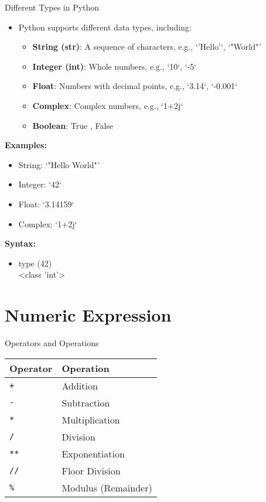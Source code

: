\documentclass[serif, aspectratio=169]{beamer}
\begin{document}
\begin{frame}{Different Types in Python}
    \begin{itemize}[<+-| alert@+>] %
        \item Python supports different data types, including:
        \begin{itemize}
            \item \textbf{String (str)}: A sequence of characters, e.g., `'Hello'`, `"World"`
            \item \textbf{Integer (int)}: Whole numbers, e.g., `10`, `-5`
            \item \textbf{Float}: Numbers with decimal points, e.g., `3.14`, `-0.001`
            \item \textbf{Complex}: Complex numbers, e.g., `1+2j`
            \item \textbf{Boolean}: True , False
        \end{itemize}
    \end{itemize}
    \vspace{0.5cm}
    \textbf{Examples:}
    \begin{itemize}
        \item String: `"Hello World"`
        \item Integer: `42`
        \item Float: `3.14159`
        \item Complex: `1+2j`
    \end{itemize}
    \textbf{Syntax:}
    \begin{itemize}
        \item type (42)\\
<class ’int’>
    \end{itemize}
    
\end{frame}

\section{Numeric Expression}

\begin{frame}{Operators and Operations}
    \begin{tabular}{|l|l|}
        \hline
        \textbf{Operator} & \textbf{Operation} \\
        \hline
        \texttt{+} & Addition \\
        \texttt{-} & Subtraction \\
        \texttt{*} & Multiplication \\
        \texttt{/} & Division \\
        \texttt{**} & Exponentiation \\
        \texttt{//} & Floor Division \\
        \texttt{\%} & Modulus (Remainder) \\
        \hline
    \end{tabular}
\end{frame}
\end{document}
